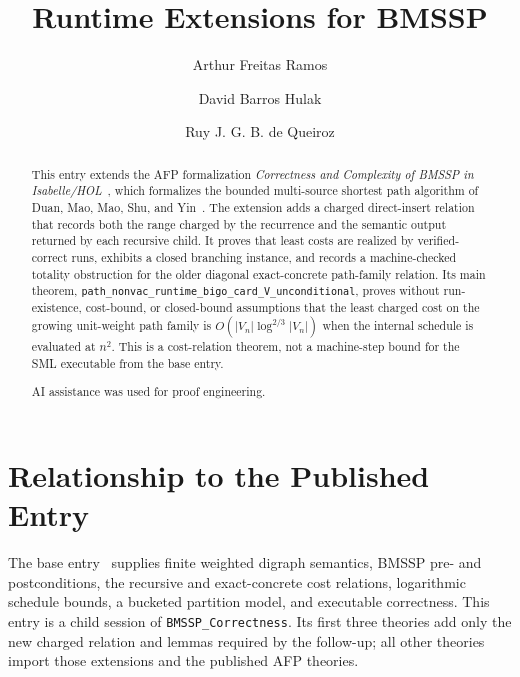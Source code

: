 \documentclass[11pt,a4paper]{article}
\begin{document}
\title{Runtime Extensions for BMSSP}
\author{Arthur Freitas Ramos \and David Barros Hulak \and Ruy J. G. B. de Queiroz}
\maketitle

\begin{abstract}
This entry extends the AFP formalization
\emph{Correctness and Complexity of BMSSP in Isabelle/HOL}~\cite{BMSSP-AFP},
which formalizes the bounded multi-source shortest path algorithm of Duan,
Mao, Mao, Shu, and Yin~\cite{DuanMaoMaoShuYin2025}. 
The extension adds a charged direct-insert relation that records both the
range charged by the recurrence and the semantic output returned by each
recursive child.  It proves that least costs are realized by verified-correct
runs, exhibits a closed branching instance, and records a
machine-checked totality obstruction for the older diagonal exact-concrete
path-family relation.  Its main theorem,
\texttt{path\_nonvac\_runtime\_bigo\_card\_V\_unconditional}, proves without
run-existence, cost-bound, or closed-bound assumptions that the least charged
cost on the growing unit-weight path family is
\(O(\lvert V_n\rvert \log^{2/3}\lvert V_n\rvert)\) when the internal schedule
is evaluated at \(n^2\).  This is a cost-relation theorem, not a machine-step
bound for the SML executable from the base entry.

AI assistance was used for proof engineering.
\end{abstract}

\tableofcontents

\section{Relationship to the Published Entry}

The base entry~\cite{BMSSP-AFP} supplies finite weighted digraph semantics,
BMSSP pre- and postconditions, the recursive and exact-concrete cost
relations, logarithmic schedule bounds, a bucketed partition model, and
executable correctness.  This entry is a child session of
\texttt{BMSSP\_Correctness}.  Its first three theories add only the new
charged relation and lemmas required by the follow-up; all other theories
import those extensions and the published AFP theories.
\end{document}
